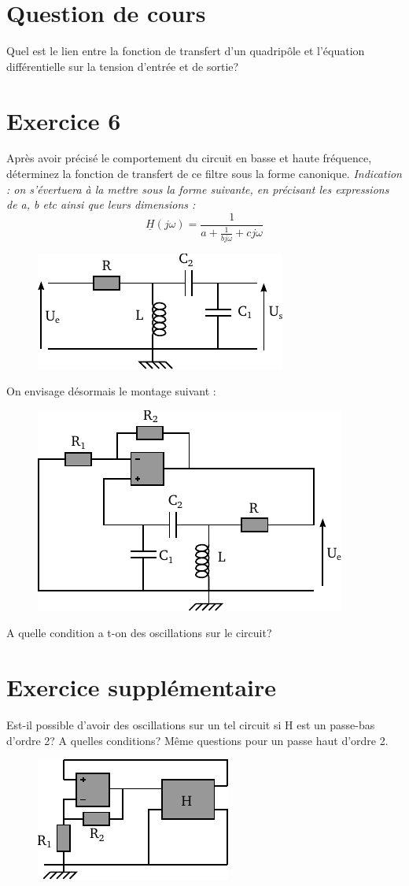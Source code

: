 \documentclass{report}
\begin{document}
\newpage

\section*{Question de cours}
Quel est le lien entre la fonction de transfert d'un quadripôle et l'équation différentielle sur la tension d'entrée et de sortie?
\section*{Exercice 6}
Après avoir précisé le comportement du circuit en basse et haute fréquence, déterminez la fonction de transfert de ce filtre sous la forme canonique.
\textit{Indication : on s'évertuera à la mettre sous la forme suivante, en précisant les expressions de a, b etc ainsi que leurs dimensions : 
\begin{equation}
\underline{H}(j\omega)=\frac{1}{a+\frac{1}{bj\omega}+cj\omega}
\end{equation}
}
\begin{figure}[!h]
\centering
\includegraphics[width=0.4\linewidth]{circuit_7.pdf}
\end{figure}

On envisage désormais le montage suivant : 
\begin{figure}[!h]
\centering
\includegraphics[width=0.4\linewidth]{circuit_8.pdf}
\end{figure}

A quelle condition a t-on des oscillations sur le circuit?

\section*{Exercice supplémentaire}
Est-il possible d'avoir des oscillations sur un tel circuit si H est un passe-bas d'ordre 2? A quelles conditions? 
Même questions pour un passe haut d'ordre 2.
\begin{figure}[!h]
\centering
\includegraphics[width=0.3\linewidth]{circuit_9.pdf}
\end{figure}
\end{document}
